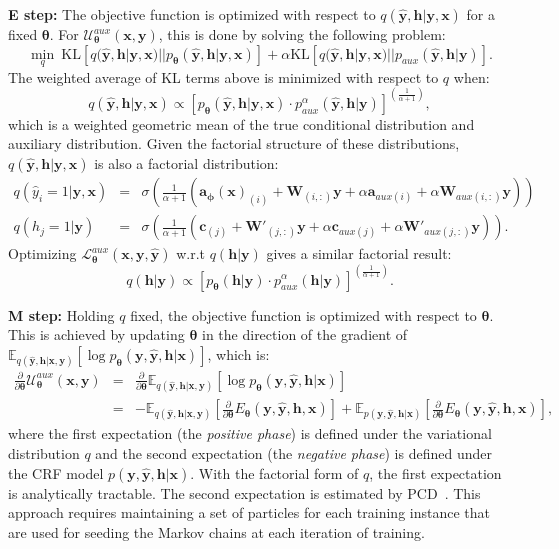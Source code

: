 \documentclass{article}
\newcommand{\x}{{\pmb{x}}}
\newcommand{\y}{{\pmb{y}}}
\newcommand{\yh}{{\hat{\pmb{y}}}}
\newcommand{\h}{{\pmb{h}}}
\renewcommand{\a}{{\pmb{a}}}
\renewcommand{\c}{{\pmb{c}}}
\newcommand{\W}{{\pmb{W}}}
\newcommand{\btheta}{{\pmb{\theta}}}
\newcommand{\bphi}{{\pmb{\phi}}}
\renewcommand{\L}{{\mathcal{L}}}
\newcommand{\U}{{\mathcal{U}}}
\def\KL{\text{KL}}
\begin{document}
\textbf{E step:} The objective function is optimized with respect to $q(\yh, \h| \y, \x)$ for a fixed $\btheta$. For $\U^{aux}_{\btheta}(\x, \y)$, this is done by solving the following problem:
\begin{equation}
\min_q \ \KL[q(\yh, \h| \y, \x) || p_\btheta(\yh, \h| \y, \x)] + \alpha \KL[q(\yh, \h| \y, \x) || p_{aux}(\yh, \h| \y)].
\end{equation}
The weighted average of KL terms above is minimized with respect to $q$ when:
\begin{equation} \label{eq:geo_mean}
q(\yh, \h| \y, \x) \propto \left[ p_\btheta(\yh, \h| \y, \x) \cdot p^{\alpha}_{aux}(\yh, \h| \y) \right]^{(\frac{1}{\alpha + 1})},
\end{equation}
which is a weighted geometric mean of the true conditional distribution and auxiliary distribution. Given the factorial structure of these distributions, 
$q(\yh, \h| \y, \x)$ is also a factorial distribution:
{\small \begin{eqnarray} \label{eq:q_factors}
q(\hat{y}_i=1| \y, \x) &=& \sigma\left( \frac{1}{\alpha + 1} (\a_\bphi(\x)_{(i)} + \W_{(i,:)}\y + \alpha \a_{aux(i)} + \alpha \W_{aux(i,:)}\y)\right) \nonumber \\
q(h_j=1| \y) &=& \sigma\left( \frac{1}{\alpha + 1} (\c_{(j)} + \W'_{(j,:)}\y + \alpha \c_{aux(j)} + \alpha \W'_{aux(j,:)}\y )\right). \nonumber
\end{eqnarray} }
Optimizing $\L^{aux}_{\btheta}(\x, \y, \yh)$ w.r.t $q(\h|\y)$ gives a similar factorial result:
\begin{equation} \label{eq:geo_mean2}
q(\h| \y) \propto \left[p_\btheta(\h|\y) \cdot p^{\alpha}_{aux}(\h| \y) \right]^{(\frac{1}{\alpha + 1})}.
\end{equation}

\textbf{M step:} Holding $q$ fixed, the objective function is optimized with respect to $\btheta$. This is achieved by updating $\btheta$ in the direction of 
the gradient of $\mathbb{E}_{q(\yh, \h|\x,\y)} [\log p_\btheta(\y, \yh, \h|\x)]$, which is:
 \begin{eqnarray}
\frac{\partial}{\partial \btheta} \U^{aux}_{\btheta}(\x, \y) &=& \frac{\partial}{\partial \btheta} \mathbb{E}_{q(\yh, \h|\x,\y)} [\log p_\btheta(\y, \yh, \h|\x)] \nonumber \\
&=& - \mathbb{E}_{q(\yh, \h|\x,\y)} [\frac{\partial}{\partial \btheta} E_\btheta(\y, \yh, \h, \x)] 
+ \mathbb{E}_{p(\y, \yh, \h | \x)} [\frac{\partial}{\partial \btheta}  E_\btheta(\y, \yh, \h, \x)],  \label{eq:grad_loss_noisy}
\end{eqnarray}
where the first expectation (the \textit{positive phase}) is defined under the variational distribution $q$ and the second expectation (the \textit{negative phase}) is defined under 
the CRF model $p(\y, \yh, \h | \x)$. With the factorial form of $q$, the first expectation is analytically tractable. 
The second expectation is estimated by PCD~\cite{tieleman2008training, younes1989parametric, kirillov2015joint}. 
This approach requires maintaining a set of particles for each training instance that are used for seeding
the Markov chains at each iteration of training.
\end{document}
